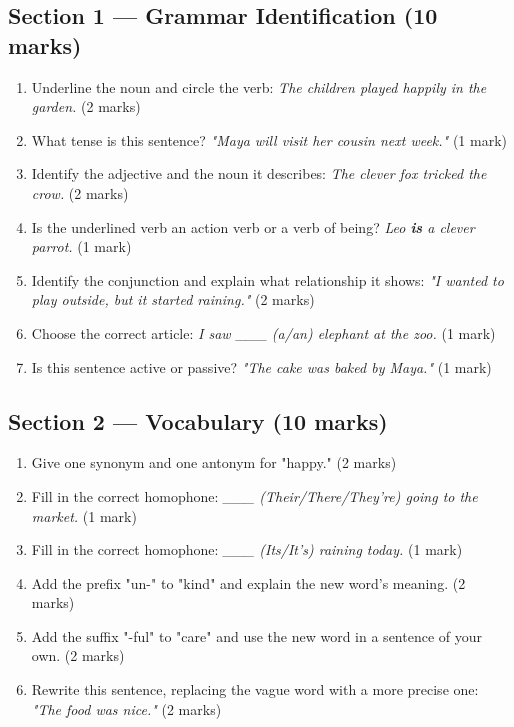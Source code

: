 \subsection*{Section 1 — Grammar Identification (10 marks)}
\begin{enumerate}
    \item Underline the noun and circle the verb: \textit{The children played happily in the garden.} (2 marks)
    \item What tense is this sentence? \textit{"Maya will visit her cousin next week."} (1 mark)
    \item Identify the adjective and the noun it describes: \textit{The clever fox tricked the crow.} (2 marks)
    \item Is the underlined verb an action verb or a verb of being? \textit{Leo \textbf{is} a clever parrot.} (1 mark)
    \item Identify the conjunction and explain what relationship it shows: \textit{"I wanted to play outside, but it started raining."} (2 marks)
    \item Choose the correct article: \textit{I saw \_\_\_ (a/an) elephant at the zoo.} (1 mark)
    \item Is this sentence active or passive? \textit{"The cake was baked by Maya."} (1 mark)
\end{enumerate}

\subsection*{Section 2 — Vocabulary (10 marks)}
\begin{enumerate}
    \item Give one synonym and one antonym for "happy." (2 marks)
    \item Fill in the correct homophone: \textit{\_\_\_ (Their/There/They're) going to the market.} (1 mark)
    \item Fill in the correct homophone: \textit{\_\_\_ (Its/It's) raining today.} (1 mark)
    \item Add the prefix "un-" to "kind" and explain the new word's meaning. (2 marks)
    \item Add the suffix "-ful" to "care" and use the new word in a sentence of your own. (2 marks)
    \item Rewrite this sentence, replacing the vague word with a more precise one: \textit{"The food was nice."} (2 marks)
\end{enumerate}

